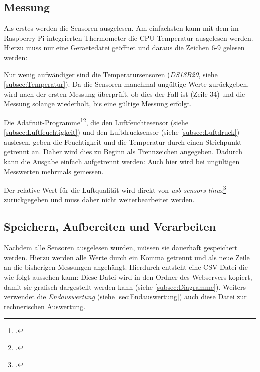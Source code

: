 
\subsection{Messung}
\label{subsec:main.sh/messung}

Als erstes werden die Sensoren ausgelesen. Am einfachsten kann mit dem im Raspberry Pi integrierten Thermometer die \gls{CPU}-Temperatur ausgelesen werden. Hierzu muss nur eine \gls{Geraetedatei} geöffnet und daraus die Zeichen 6-9 gelesen werden:

Nur wenig aufwändiger sind die Temperatursensoren (\emph{DS18B20}, siehe \ref{subsec:Temperatur}). Da die Sensoren manchmal ungültige Werte zurückgeben, wird nach der ersten Messung überprüft, ob dies der Fall ist (Zeile 34) und die Messung solange wiederholt, bis eine gültige Messung erfolgt.

Die Adafruit-Programme\footcite{DHT}\footcite{bmp058_adafruit}, die den Luftfeuchtesensor (siehe \ref{subsec:Luftfeuchtigkeit}) und den Luftdrucksensor (siehe \ref{subsec:Luftdruck}) auslesen, geben die Feuchtigkeit und die Temperatur durch einen Strichpunkt getrennt an. Daher wird dies zu Beginn als Trennzeichen angegeben. 
Dadurch kann die Ausgabe einfach aufgetrennt werden:
Auch hier wird bei ungültigen Messwerten mehrmals gemessen.

Der relative Wert für die Luftqualität wird direkt von \emph{usb-sensors-linux}\footcite{usb-sensors-linux} zurückgegeben und muss daher nicht weiterbearbeitet werden.

\subsection{Speichern, Aufbereiten und Verarbeiten}

Nachdem alle Sensoren ausgelesen wurden, müssen sie dauerhaft gespeichert werden. Hierzu werden alle Werte durch ein Komma getrennt und als neue Zeile an die bisherigen Messungen angehängt.
Hierdurch entsteht eine \gls{CSV}-Datei die wie folgt aussehen kann:
Diese Datei wird in den Ordner des Webservers kopiert, damit sie grafisch dargestellt werden kann (siehe \ref{subsec:Diagramme}). Weiters verwendet die \textit{Endauswertung} (siehe \ref{sec:Endauswertung}) auch diese Datei zur rechnerischen Auswertung.

